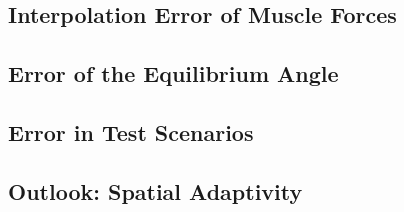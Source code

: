 \subsection{Interpolation Error of Muscle Forces}
\label{sec:732forceInterpolation}

\dummytext[3]{}



\subsection{Error of the Equilibrium Angle}
\label{sec:733equilbriumAngle}

\dummytext[3]{}



\subsection{Error in Test Scenarios}
\label{sec:734scenarios}

\dummytext[3]{}



\subsection{Outlook: Spatial Adaptivity}
\label{sec:735adaptivity}

\dummytext[3]{}
